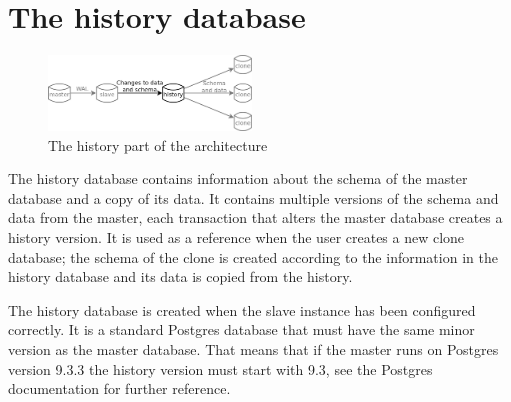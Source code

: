 \section{The history database}

\begin{figure}
  \vspace{-20pt}
  \begin{center}
    \includegraphics[width=0.48\textwidth]{img/architecture-history}
  \end{center}
  \vspace{-20pt}
  \caption{The history part of the architecture}
  \vspace{-10pt}
\end{figure}

The history database contains information about the schema of the master database and a copy of its data.
It contains multiple versions of the schema and data from the master, each transaction that alters the master database creates a history version.
It is used as a reference when the user creates a new clone database; the schema of the clone is created according to the information in the history database and its data is copied from the history.

The history database is created when the slave instance has been configured correctly.
It is a standard Postgres database that must have the same minor version as the master database.
That means that if the master runs on Postgres version 9.3.3 the history version must start with 9.3, see the Postgres documentation for further reference. %




